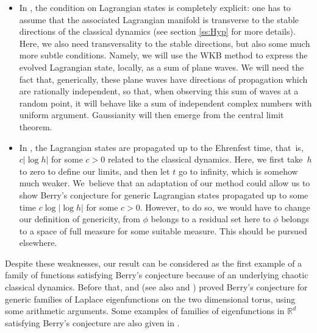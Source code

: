 \documentclass[JEP,XML,SOM,Unicode,published]{cedram}
\theoremstyle{plain}
\theoremstyle{definition}
\newcommand{\R}{\mathbb{R}}
\begin{document}
\begin{itemize}
\item In \cite{Schu}, the condition on Lagrangian states is completely explicit: one has to assume that the associated Lagrangian manifold is transverse to the stable directions of the classical dynamics (see section \ref{ss:Hyp} for more details). Here, we also need transversality to the stable directions, but also some much more subtle conditions. Namely, we will use the WKB method to express the evolved Lagrangian state, locally, as a sum of plane waves. We will need the fact that, generically, these plane waves have directions of propagation which are rationally independent, so that, when observing this sum of waves at a random point, it will behave like a sum of independent complex numbers with uniform argument. Gaussianity will then emerge from the central limit theorem.

\item In \cite{Schu}, the Lagrangian states are propagated up to the Ehrenfest time, that~is, $c |\log h|$ for some $c>0$ related to the classical dynamics. Here, we first take~$h$ to zero to define our limits, and then let $t$ go to infinity, which is somehow much weaker. We~believe that an adaptation of our method could allow us to show Berry's conjecture for generic Lagrangian states propagated up to some time $c \log |\log h|$ for some $c>0$. However, to do so, we would have to change our definition of genericity, from $\phi$ belongs to a residual set here to $\phi$ belongs to a space of full measure for some suitable measure. This should be pursued elsewhere.
\end{itemize}

Despite these weaknesses, our result can be considered as the first example of a family of functions satisfying Berry's conjecture because of an underlying chaotic classical dynamics. Before that, \cite{Bou} and \cite{BW} (see also \cite{LWL} and \cite{Sar}) proved Berry's conjecture for generic families of Laplace eigenfunctions on the two dimensional torus, using some arithmetic arguments. Some examples of families of eigenfunctions in $\R^d$ satisfying Berry's conjecture are also given in \cite{RomSar}.\enlargethispage{.5\baselineskip}%
\end{document}
